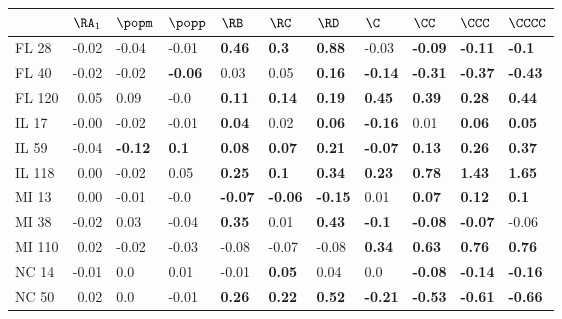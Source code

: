 \begin{tabular}{lrlllllllll}
\toprule
{} &  $\RA_1$ &         $\popm$ &         $\popp$ &           $\RB$ &           $\RC$ &           $\RD$ &            $\C$ &           $\CC$ &          $\CCC$ &         $\CCCC$ \\
\midrule
FL 28   &    -0.02 &           -0.04 &           -0.01 &   \textbf{0.46} &    \textbf{0.3} &   \textbf{0.88} &           -0.03 &  \textbf{-0.09} &  \textbf{-0.11} &   \textbf{-0.1} \\
FL 40   &    -0.02 &           -0.02 &  \textbf{-0.06} &            0.03 &            0.05 &   \textbf{0.16} &  \textbf{-0.14} &  \textbf{-0.31} &  \textbf{-0.37} &  \textbf{-0.43} \\
FL 120  &     0.05 &            0.09 &            -0.0 &   \textbf{0.11} &   \textbf{0.14} &   \textbf{0.19} &   \textbf{0.45} &   \textbf{0.39} &   \textbf{0.28} &   \textbf{0.44} \\
IL 17   &    -0.00 &           -0.02 &           -0.01 &   \textbf{0.04} &            0.02 &   \textbf{0.06} &  \textbf{-0.16} &            0.01 &   \textbf{0.06} &   \textbf{0.05} \\
IL 59   &    -0.04 &  \textbf{-0.12} &    \textbf{0.1} &   \textbf{0.08} &   \textbf{0.07} &   \textbf{0.21} &  \textbf{-0.07} &   \textbf{0.13} &   \textbf{0.26} &   \textbf{0.37} \\
IL 118  &     0.00 &           -0.02 &            0.05 &   \textbf{0.25} &    \textbf{0.1} &   \textbf{0.34} &   \textbf{0.23} &   \textbf{0.78} &   \textbf{1.43} &   \textbf{1.65} \\
MI 13   &     0.00 &           -0.01 &            -0.0 &  \textbf{-0.07} &  \textbf{-0.06} &  \textbf{-0.15} &            0.01 &   \textbf{0.07} &   \textbf{0.12} &    \textbf{0.1} \\
MI 38   &    -0.02 &            0.03 &           -0.04 &   \textbf{0.35} &            0.01 &   \textbf{0.43} &   \textbf{-0.1} &  \textbf{-0.08} &  \textbf{-0.07} &           -0.06 \\
MI 110  &     0.02 &           -0.02 &           -0.03 &           -0.08 &           -0.07 &           -0.08 &   \textbf{0.34} &   \textbf{0.63} &   \textbf{0.76} &   \textbf{0.76} \\
NC 14   &    -0.01 &             0.0 &            0.01 &           -0.01 &   \textbf{0.05} &            0.04 &             0.0 &  \textbf{-0.08} &  \textbf{-0.14} &  \textbf{-0.16} \\
NC 50   &     0.02 &             0.0 &           -0.01 &   \textbf{0.26} &   \textbf{0.22} &   \textbf{0.52} &  \textbf{-0.21} &  \textbf{-0.53} &  \textbf{-0.61} &  \textbf{-0.66} \\

\end{tabular}
